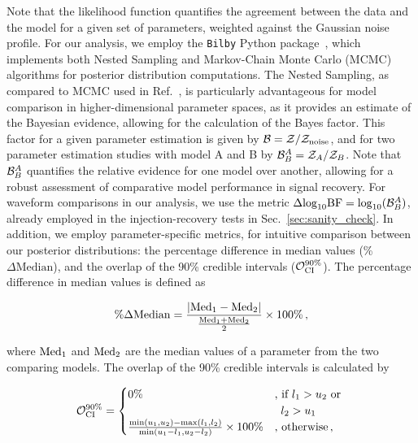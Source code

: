 \documentclass[aps,prd,twocolumn,superscriptaddress,groupedaddress,nofootinbib,showpacs,eqsecnum,useAms]{revtex4-2}
\begin{document}
Note that 
the likelihood function quantifies the agreement between the data and the model for a given set of parameters, weighted against the Gaussian noise profile. For our analysis, we employ the \texttt{Bilby} Python package~\cite{bilby_paper, bilby_pipe_paper}, which implements both Nested Sampling and Markov-Chain Monte Carlo (MCMC) algorithms for posterior distribution computations.
The Nested Sampling, as compared to MCMC used in Ref.~\cite{LNB}, is particularly advantageous for model comparison in higher-dimensional parameter spaces, as it provides an estimate of the Bayesian evidence, allowing for the calculation of the Bayes factor.
This 
factor for a given parameter estimation is given by ${\cal B} = {\cal Z}/{\cal Z}_{\rm noise}$, and for two parameter estimation studies  with model A and B by ${\cal B}_B^A = {\cal Z}_A/{\cal Z}_B$.
Note that ${\cal B}_B^A$ quantifies the relative evidence for one model over another, allowing for a robust assessment of comparative model performance in signal recovery. For waveform comparisons in our analysis, we use the metric $\Delta{\rm log}_{10}{\rm BF}={\rm log}_{10}({\cal B}_B^A)$, already employed in the injection-recovery tests in Sec.~\ref{sec:sanity_check}. In addition, we employ parameter-specific metrics, for intuitive comparison between our posterior distributions: the percentage difference in median values (\%$\Delta \mathrm{Median}$), and the overlap of the 90\% credible intervals (${\cal O}_{\rm CI}^{90\%}$). The percentage difference in median values is defined as

\begin{equation}
\% \Delta \mathrm{Median} = \frac{|{\rm Med}_1 - {\rm Med}_2|}{\frac{{\rm Med}_1 + {\rm Med}_2}{2}} \times 100\%\,,
\end{equation}

where ${\rm Med}_1$ and ${\rm Med}_2$ are the median values of a parameter from the two comparing models. The overlap of the 90\% credible intervals is calculated by

\begin{equation}
{\cal O}_{\rm CI}^{90\%} =
\begin{cases}
0\% & \text{, if } l_1 > u_2 \text{ or } \\ &\;\;l_2 > u_1 \\
\frac{\min(u_1, u_2) - \max(l_1, l_2)}{\min(u_1 - l_1, u_2 - l_2)} \times 100\% & \text{, otherwise} \,,
\end{cases}
\end{equation}
\end{document}
